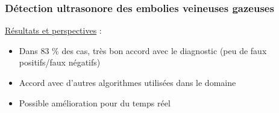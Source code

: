 \documentclass{beamer}
\begin{document}
\begin{frame}
\begin{center}
\end{center}

\end{frame}

\begin{frame}
\frametitle{Détection ultrasonore des embolies veineuses gazeuses}
\underline{Résultats et perspectives} :
\vspace{0.3cm}
\begin{itemize}
\item Dans 83 \% des cas, très bon accord avec le diagnostic (peu de faux positifs/faux négatifs)
\vspace{0.3cm}
\item Accord avec d'autres algorithmes utilisées dans le domaine
\vspace{0.3cm}
\item Possible amélioration pour du temps réel
\end{itemize}
\end{frame}
\end{document}
